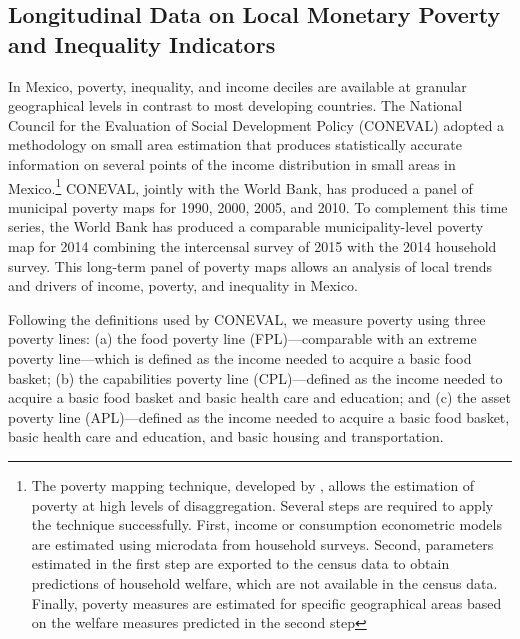 \documentclass[dv_diss_main.tex]{subfiles}
\begin{document}
\subsection {Longitudinal Data on Local Monetary Poverty and Inequality Indicators}\label{subsec:monentary}

In Mexico, poverty, inequality, and income deciles are available at granular geographical levels in contrast to most developing countries. The National Council for the Evaluation of Social Development Policy (CONEVAL) adopted a methodology on small area estimation that produces statistically accurate information on several points of the income distribution in small areas in Mexico.\footnote{The poverty mapping technique, developed by \cite{elbers2003micro}, allows the estimation of poverty at high levels of disaggregation. Several steps are required to apply the technique successfully. First, income or consumption econometric models are estimated using microdata from household surveys. Second, parameters estimated in the first step are exported to the census data to obtain predictions of household welfare, which are not available in the census data. Finally, poverty measures are estimated for specific geographical areas based on the welfare measures predicted in the second step} CONEVAL, jointly with the World Bank, has produced a panel of municipal poverty maps for 1990, 2000, 2005, and 2010. To complement this time series, the World Bank has produced a comparable municipality-level poverty map for 2014 combining the intercensal survey of 2015 with the 2014 household survey. This long-term panel of poverty maps allows an analysis of local trends and drivers of income, poverty, and inequality in Mexico.

Following the definitions used by CONEVAL, we measure poverty using three poverty lines: (a) the food poverty line (FPL)—comparable with an extreme poverty line—which is defined as the income needed to acquire a basic food basket; (b) the capabilities poverty line (CPL)—defined as the income needed to acquire a basic food basket and basic health care and education; and (c) the asset poverty line (APL)—defined as the income needed to acquire a basic food basket, basic health care and education, and basic housing and transportation.
\end{document}
